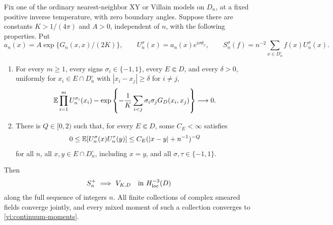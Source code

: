 \begin{theorem}
\label{vi:field-transfer}
Fix one of the ordinary nearest-neighbor XY or Villain models on $D_n$,
at a fixed positive inverse temperature, with zero boundary angles.
Suppose there are constants $K>1/(4\pi)$ and $A>0$, independent of $n$,
with the following properties.  Put
\[
 a_n(x)=A\exp\{G_n(x,x)/(2K)\},\qquad
 U_n^\sigma(x)=a_n(x)e^{i\sigma\theta_x},\qquad
 S_n^\sigma(f)=n^{-2}\sum_{x\in D_n^\circ}f(x)U_n^\sigma(x).
\]
\begin{enumerate}[label=\textup{(\roman*)}]
\item For every $m\geq1$, every signs $\sigma_i\in\{-1,1\}$,
every $E\Subset D$, and every $\delta>0$, uniformly for
$x_i\in E\cap D_n^\circ$ with $|x_i-x_j|\geq\delta$ for $i\ne j$,
\begin{equation}\label{vi:transfer-separated}
 \mathbb E\prod_{i=1}^m U_n^{\sigma_i}(x_i)
 -\exp\left\{-\frac1K\sum_{i<j}\sigma_i\sigma_j
                          G_D(x_i,x_j)\right\}\longrightarrow0.
\end{equation}
\item There is $Q\in[0,2)$ such that, for every $E\Subset D$, some
$C_E<\infty$ satisfies
\begin{equation}\label{vi:transfer-two-point}
 0\leq\mathbb E[U_n^\sigma(x)U_n^\tau(y)]
       \leq C_E(|x-y|+n^{-1})^{-Q}
\end{equation}
for all $n$, all $x,y\in E\cap D_n^\circ$, including $x=y$, and
all $\sigma,\tau\in\{-1,1\}$.
\end{enumerate}
Then
\[
 S_n^+\ \Longrightarrow\ V_{K,D}
           \quad\hbox{in }H^{-3}_{\mathrm{loc}}(D)
\]
along the full sequence of integers $n$.
All finite collections of complex smeared fields converge jointly, and
every mixed moment of such a collection converges to
\eqref{vi:continuum-moments}.
\end{theorem}

